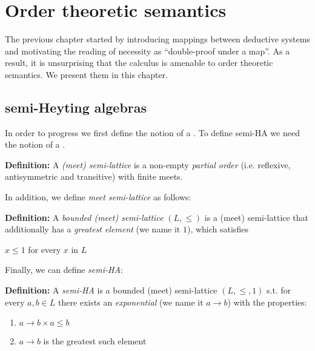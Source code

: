 \chapter{Order theoretic semantics}
\label{jcalcsem}
The previous chapter started by introducing 
mappings between deductive systems and 
motivating the reading of necessity as ``double-proof under a map''.
As a result, it is unsurprising that the calculus is amenable to order theoretic semantics.
We present them in this chapter.

\section{semi-Heyting algebras}
In order to progress we first define the notion of a 
. 
To define semi-HA we need the notion of a .
  

\begin{mdframed}
\textbf{Definition:}
A \textit{(meet) semi-lattice} is a non-empty \emph{partial order} (i.e. reflexive, antisymmetric and transitive) 
with finite meets.
\end{mdframed}
In addition, we define \emph{meet semi-lattice} as follows: 
\begin{mdframed}
\textbf{Definition:}
A \textit{bounded (meet) semi-lattice} $(L,\le)$ is a (meet) 
semi-lattice that additionally has 
a \emph{greatest element} (we name it $1$), which satisfies

$x \le 1$ for every $x$ in $L$
\end{mdframed}
Finally, we can define \emph{semi-HA}:

\begin{mdframed}
\textbf{Definition:}
A \textit{semi-HA} is a bounded (meet) semi-lattice $(L,\le, 1)$ 
s.t. for every $a,b\in L$ there exists an \textit{exponential} 
(we name it $a\rightarrow b$) 
with the properties: 
\begin{enumerate}
\item $a\rightarrow b\times a\le b $
\item $a\rightarrow b$ is the greatest such element
\end{enumerate}
\end{mdframed}

